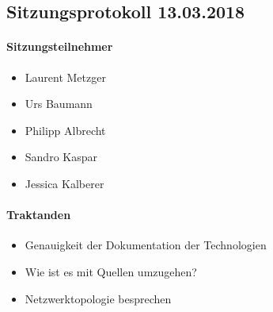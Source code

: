 \newpage






\subsection{Sitzungsprotokoll 13.03.2018}

\paragraph{Sitzungsteilnehmer}
\begin{itemize}	
	\item Laurent Metzger 
	\item Urs Baumann
	\item Philipp Albrecht
	\item Sandro Kaspar
	\item Jessica Kalberer
\end{itemize}

\paragraph{Traktanden}
\begin{itemize}	
	\item Genauigkeit der Dokumentation der Technologien
	\item Wie ist es mit Quellen umzugehen?
	\item Netzwerktopologie besprechen
\end{itemize}

